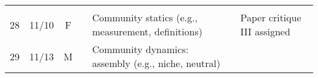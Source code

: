 \documentclass[]{article}
\begin{document}
\begin{longtable}[]{@{}cccllll@{}}
\begin{minipage}[t]{0.11\columnwidth}
\strut
\end{minipage} & \begin{minipage}[t]{0.16\columnwidth}\raggedright\strut
\strut
\end{minipage}\tabularnewline
\begin{minipage}[t]{0.12\columnwidth}\centering\strut
28\strut
\end{minipage} & \begin{minipage}[t]{0.08\columnwidth}\centering\strut
11/10\strut
\end{minipage} & \begin{minipage}[t]{0.07\columnwidth}\centering\strut
F\strut
\end{minipage} & \begin{minipage}[t]{0.10\columnwidth}\raggedright\strut
\strut
\end{minipage} & \begin{minipage}[t]{0.11\columnwidth}\raggedright\strut
Community statics (e.g., measurement, definitions)\strut
\end{minipage} & \begin{minipage}[t]{0.11\columnwidth}\raggedright\strut
\strut
\end{minipage} & \begin{minipage}[t]{0.16\columnwidth}\raggedright\strut
Paper critique III assigned\strut
\end{minipage}\tabularnewline
\begin{minipage}[t]{0.12\columnwidth}\centering\strut
29\strut
\end{minipage} & \begin{minipage}[t]{0.08\columnwidth}\centering\strut
11/13\strut
\end{minipage} & \begin{minipage}[t]{0.07\columnwidth}\centering\strut
M\strut
\end{minipage} & \begin{minipage}[t]{0.10\columnwidth}\raggedright\strut
\strut
\end{minipage} & \begin{minipage}[t]{0.11\columnwidth}\raggedright\strut
Community dynamics: assembly (e.g., niche, neutral)\strut
\end{minipage} & \begin{minipage}[t]{0.11\columnwidth}\raggedright\strut
\strut
\end{minipage} & \begin{minipage}[t]{0.16\columnwidth}\raggedright\strut
\strut
\end{minipage}\tabularnewline

\end{longtable}
\end{document}
